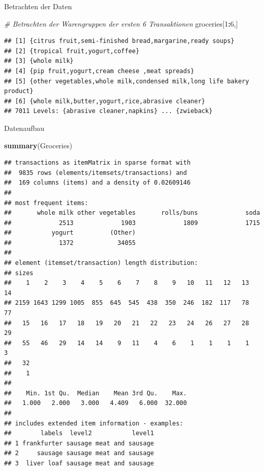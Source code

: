 \documentclass[12pt,ngerman,a4paper,ignorenonframetext,]{beamer}
\newenvironment{Shaded}{\begin{snugshade}}{\end{snugshade}}
\newcommand{\CommentTok}[1]{\textcolor[rgb]{0.56,0.35,0.01}{\textit{#1}}}
\newcommand{\DecValTok}[1]{\textcolor[rgb]{0.00,0.00,0.81}{#1}}
\newcommand{\KeywordTok}[1]{\textcolor[rgb]{0.13,0.29,0.53}{\textbf{#1}}}
\newcommand{\NormalTok}[1]{#1}
\newcommand{\OperatorTok}[1]{\textcolor[rgb]{0.81,0.36,0.00}{\textbf{#1}}}
\begin{document}
\begin{frame}{Betrachten der Daten}
\protect\hypertarget{betrachten-der-daten}{}

\begin{Shaded}
\begin{Highlighting}[]
\CommentTok{# Betrachten der Warengruppen der ersten 6 Transaktionen}
\NormalTok{groceries[}\DecValTok{1}\OperatorTok{:}\DecValTok{6}\NormalTok{,]}
\end{Highlighting}
\end{Shaded}

\begin{verbatim}
## [1] {citrus fruit,semi-finished bread,margarine,ready soups}             
## [2] {tropical fruit,yogurt,coffee}                                       
## [3] {whole milk}                                                         
## [4] {pip fruit,yogurt,cream cheese ,meat spreads}                        
## [5] {other vegetables,whole milk,condensed milk,long life bakery product}
## [6] {whole milk,butter,yogurt,rice,abrasive cleaner}                     
## 7011 Levels: {abrasive cleaner,napkins} ... {zwieback}
\end{verbatim}

\end{frame}

\begin{frame}{Datenaufbau}
\protect\hypertarget{datenaufbau}{}

\begin{Shaded}
\begin{Highlighting}[]
\KeywordTok{summary}\NormalTok{(Groceries)}
\end{Highlighting}
\end{Shaded}

\begin{verbatim}
## transactions as itemMatrix in sparse format with
##  9835 rows (elements/itemsets/transactions) and
##  169 columns (items) and a density of 0.02609146 
## 
## most frequent items:
##       whole milk other vegetables       rolls/buns             soda 
##             2513             1903             1809             1715 
##           yogurt          (Other) 
##             1372            34055 
## 
## element (itemset/transaction) length distribution:
## sizes
##    1    2    3    4    5    6    7    8    9   10   11   12   13   14 
## 2159 1643 1299 1005  855  645  545  438  350  246  182  117   78   77 
##   15   16   17   18   19   20   21   22   23   24   26   27   28   29 
##   55   46   29   14   14    9   11    4    6    1    1    1    1    3 
##   32 
##    1 
## 
##    Min. 1st Qu.  Median    Mean 3rd Qu.    Max. 
##   1.000   2.000   3.000   4.409   6.000  32.000 
## 
## includes extended item information - examples:
##        labels  level2           level1
## 1 frankfurter sausage meat and sausage
## 2     sausage sausage meat and sausage
## 3  liver loaf sausage meat and sausage
\end{verbatim}

\end{frame}
\end{document}
